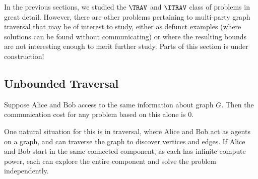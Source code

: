 In the previous sections, we studied the $\TRAV$ and $\ITRAV$ class of problems in great detail. However, there are other problems pertaining to multi-party graph traversal that may be of interest to study, either as defunct examples (where solutions can be found without communicating) or where the resulting bounds are not interesting enough to merit further study. Parts of this section is under construction!

\subsection{Unbounded Traversal}

\begin{claim}
Suppose Alice and Bob access to the same information about graph $G$. Then the communication cost for any problem based on this alone is $0$.
\end{claim}

One natural situation for this is in traversal, where Alice and Bob act as agents on a graph, and can traverse the graph to discover vertices and edges. If Alice and Bob start in the same connected component, as each has infinite compute power, each can explore the entire component and solve the problem independently.